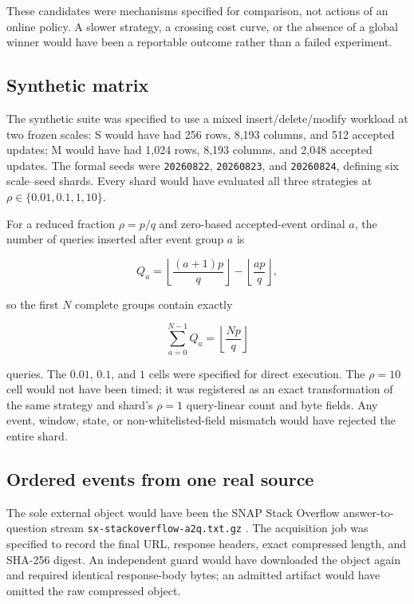 These candidates were mechanisms specified for comparison, not actions of an online policy. A slower strategy, a crossing cost curve, or the absence of a global winner would have been a reportable outcome rather than a failed experiment.

\subsection{Synthetic matrix}\label{synthetic-matrix}

The synthetic suite was specified to use a mixed insert/delete/modify workload at two frozen scales: S would have had 256 rows, 8,193 columns, and 512 accepted updates; M would have had 1,024 rows, 8,193 columns, and 2,048 accepted updates. The formal seeds were \texttt{20260822}, \texttt{20260823}, and \texttt{20260824}, defining six scale--seed shards. Every shard would have evaluated all three strategies at \(\rho\in\{0.01,0.1,1,10\}\).

For a reduced fraction \(\rho=p/q\) and zero-based accepted-event ordinal \(a\), the number of queries inserted after event group \(a\) is

\[
Q_a=
\left\lfloor\frac{(a+1)p}{q}\right\rfloor-
\left\lfloor\frac{ap}{q}\right\rfloor,
\]

so the first \(N\) complete groups contain exactly

\[
\sum_{a=0}^{N-1}Q_a=\left\lfloor\frac{Np}{q}\right\rfloor
\]

queries. The \(0.01\), \(0.1\), and \(1\) cells were specified for direct execution. The \(\rho=10\) cell would not have been timed; it was registered as an exact transformation of the same strategy and shard's \(\rho=1\) query-linear count and byte fields. Any event, window, state, or non-whitelisted-field mismatch would have rejected the entire shard.

\subsection{Ordered events from one real source}\label{ordered-events-from-one-real-source}

The sole external object would have been the SNAP Stack Overflow answer-to-question stream \texttt{sx-stackoverflow-a2q.txt.gz} \cite{snap_stackoverflow_temporal_network,paranjape_motifs_in_temporal_networks}. The acquisition job was specified to record the final URL, response headers, exact compressed length, and SHA-256 digest. An independent guard would have downloaded the object again and required identical response-body bytes; an admitted artifact would have omitted the raw compressed object.

